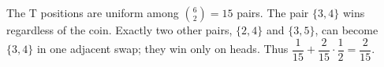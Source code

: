 The T positions are uniform among $\binom62=15$ pairs. The pair $\{3,4\}$ wins regardless of the coin. Exactly two other pairs, $\{2,4\}$ and $\{3,5\}$, can become $\{3,4\}$ in one adjacent swap; they win only on heads. Thus $\dfrac{1}{15}+\dfrac{2}{15}\cdot\dfrac{1}{2}=\boxed{\dfrac{2}{15}}$.
